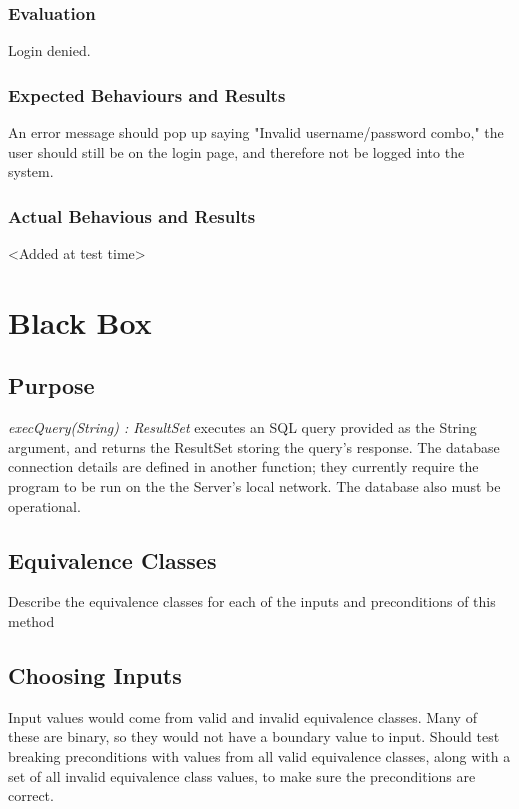 \documentclass{article}
\begin{document}
\subsubsection{Evaluation}
Login denied.

\subsubsection{Expected Behaviours and Results}
An error message should pop up saying "Invalid username/password combo," the user should still be on the login page, and therefore not be logged into the system.

\subsubsection{Actual Behavious and Results}
<Added at test time>

\section{Black Box}
\subsection{Purpose}
\textit{execQuery(String) : ResultSet} executes an SQL query provided as the String argument, and returns the ResultSet storing the query's response.  The database connection details are defined in another function; they currently require the program to be run on the the Server's local network.  The database also must be operational.

\subsection{Equivalence Classes}
Describe the equivalence classes for each of the inputs and preconditions of this method

\subsection{Choosing Inputs}
Input values would come from valid and invalid equivalence classes.  Many of these are binary, so they would not have a boundary value to input.  Should test breaking preconditions with values from all valid equivalence classes, along with a set of all invalid equivalence class values, to make sure the preconditions are correct.
\end{document}
